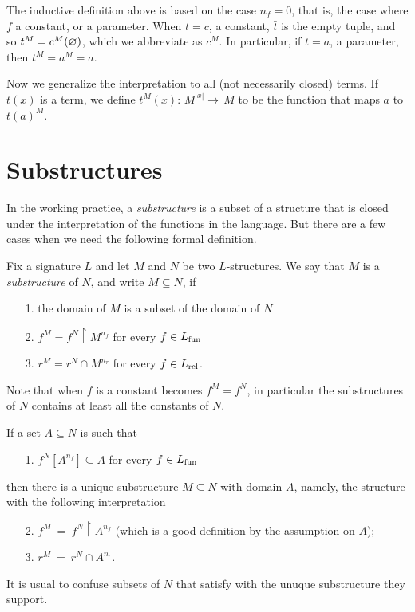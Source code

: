 The inductive definition above is based on the case $n_f=0$, that is, the case where $f$ a constant, or a parameter.  When $t=c$, a constant, $\bar t$ is the empty tuple, and so $t^M=c^M(\varnothing)$, which we abbreviate as $c^M$. In particular, if $t=a$, a parameter, then $t^M=a^M=a$.

Now we generalize the interpretation to all (not necessarily closed) terms. If $t(x)$ is a term, we define \emph{$t^M\!(x) :\,M^{|x|}\to\, M$} to be the function that maps $a$ to $t(a)^M$.

\section{Substructures}
\label{sottostrutture}


\def\medrel#1{\parbox[t]{6ex}{$\displaystyle\hfil #1$}}
\def\ceq#1#2#3{\parbox{10ex}{$\displaystyle #1$}\medrel{#2}$\displaystyle  #3$}

In the working practice, 
a \textit{substructure\/} is a subset of a structure that is closed under the interpretation of the functions in the language.  
But there are a few cases when we need the following formal definition.

\begin{definition}\label{sottostrutturadef}
Fix a signature $L$ and let $M$ and $N$ be two $L$-structures. We say that $M$ is a \emph{substructure\/} of $N$, and write \emph{$M\subseteq N$}, if
\begin{itemize}
\item[1.] the domain of $M$ is a subset of the domain of $N$
\item[2.] $f^M=f^N\restriction M^{n_f}$ for every $f\in L_{\rm fun}$
\item[3.] $r^M=r^N\cap M^{n_r}$ for every $f\in L_{\rm rel}$.
\end{itemize}
\end{definition}

Note that when $f$ is a constant  becomes $f^M=f^N$, in particular the substructures of $N$ contains at least all the constants of $N$.

If a set $A\subseteq N$ is such that 
\begin{itemize}
\item[1.] $f^N[A^{n_f}]\subseteq A$ for every  $f\in L_{\rm fun}$ 
\end{itemize}
then there is a unique substructure $M\subseteq N$ with domain $A$, namely, the structure with the following interpretation
\begin{itemize}
\item[2.] $f^M\ =\ f^N\restriction A^{n_f}$ (which is a good definition by the assumption on $A$);
\item[3.] $r^M\ =\ r^N\cap A^{n_r}$.
\end{itemize}
It is usual to confuse subsets of $N$ that satisfy  with the unuque substructure they support.

